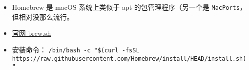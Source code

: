 
\begin{issues}
\issueDraft
\end{issues}

\begin{itemize}
\item Homebrew 是 macOS 系统上类似于 apt 的包管理程序（另一个是 \verb|MacPorts|，但相对没那么流行。
\item \href{https://brew.sh}{官网 brew.sh}
\item 安装命令： \verb|/bin/bash -c "$(curl -fsSL https://raw.githubusercontent.com/Homebrew/install/HEAD/install.sh)"|
\end{itemize}
